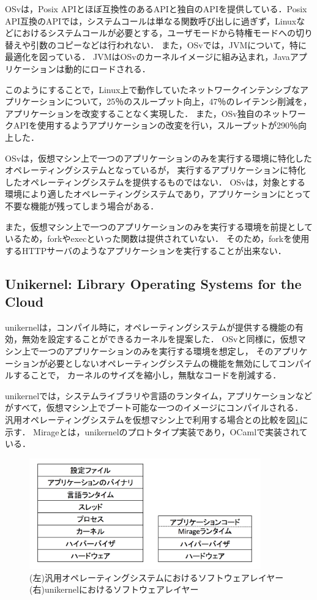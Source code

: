 \documentclass[graduation-thesis]{mlarticle}
\begin{document}
OSvは，Posix APIとほぼ互換性のあるAPIと独自のAPIを提供している．Posix API互換のAPIでは，システムコールは単なる関数呼び出しに過ぎず，Linuxなどにおけるシステムコールが必要とする，ユーザモードから特権モードへの切り替えや引数のコピーなどは行われない．
また，OSvでは，JVMについて，特に最適化を図っている．
JVMはOSvのカーネルイメージに組み込まれ，Javaアプリケーションは動的にロードされる．

このようにすることで，Linux上で動作していたネットワークインテンシブなアプリケーションについて，25％のスループット向上，47％のレイテンシ削減を，アプリケーションを改変することなく実現した．
また，OSv独自のネットワークAPIを使用するようアプリケーションの改変を行い，スループットが290％向上した．

OSvは，仮想マシン上で一つのアプリケーションのみを実行する環境に特化したオペレーティングシステムとなっているが，
実行するアプリケーションに特化したオペレーティングシステムを提供するものではない．
OSvは，対象とする環境により適したオペレーティングシステムであり，アプリケーションにとって不要な機能が残ってしまう場合がある．

また，仮想マシン上で一つのアプリケーションのみを実行する環境を前提としているため，forkやexecといった関数は提供されていない．
そのため，forkを使用するHTTPサーバのようなアプリケーションを実行することが出来ない．

\subsection {Unikernel: Library Operating Systems for the Cloud}
\label{relative:unikernel}
unikernelは，コンパイル時に，オペレーティングシステムが提供する機能の有効，無効を設定することができるカーネルを提案した．
OSvと同様に，仮想マシン上で一つのアプリケーションのみを実行する環境を想定し，
そのアプリケーションが必要としないオペレーティングシステムの機能を無効にしてコンパイルすることで，
カーネルのサイズを縮小し，無駄なコードを削減する．

unikernelでは，システムライブラリや言語のランタイム，アプリケーションなどがすべて，仮想マシン上でブート可能な一つのイメージにコンパイルされる．
汎用オペレーティングシステムを仮想マシン上で利用する場合との比較を図\ref{fig:unikernel}に示す．
Mirageとは，unikernelのプロトタイプ実装であり，OCamlで実装されている．

\begin{figure}[H]
  \begin{center}
    \includegraphics[width=10.0cm]{images/unikernel.png}
    \caption{(左)汎用オペレーティングシステムにおけるソフトウェアレイヤー (右)unikernelにおけるソフトウェアレイヤー}
    \label{fig:unikernel}
  \end{center}
\end{figure}
\end{document}
